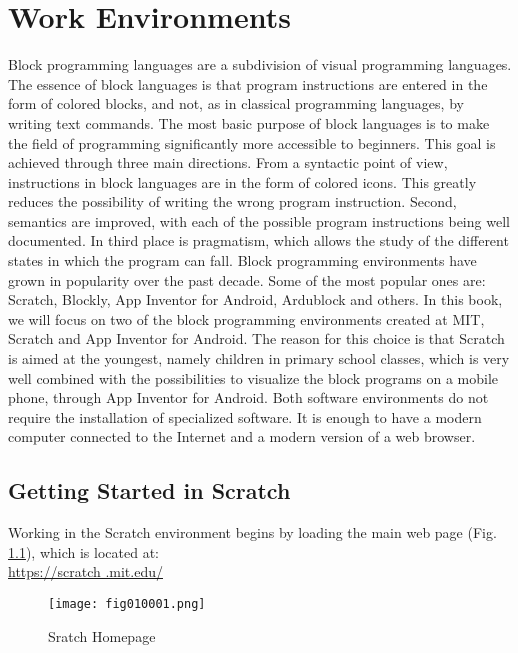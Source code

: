 \chapter{Work Environments}

Block programming languages are a subdivision of visual programming languages. The essence of block languages is that program instructions are entered in the form of colored blocks, and not, as in classical programming languages, by writing text commands. The most basic purpose of block languages is to make the field of programming significantly more accessible to beginners. This goal is achieved through three main directions. From a syntactic point of view, instructions in block languages are in the form of colored icons. This greatly reduces the possibility of writing the wrong program instruction. Second, semantics are improved, with each of the possible program instructions being well documented. In third place is pragmatism, which allows the study of the different states in which the program can fall. Block programming environments have grown in popularity over the past decade. Some of the most popular ones are: Scratch, Blockly, App Inventor for Android, Ardublock and others. In this book, we will focus on two of the block programming environments created at MIT, Scratch and App Inventor for Android. The reason for this choice is that Scratch is aimed at the youngest, namely children in primary school classes, which is very well combined with the possibilities to visualize the block programs on a mobile phone, through App Inventor for Android. Both software environments do not require the installation of specialized software. It is enough to have a modern computer connected to the Internet and a modern version of a web browser.

\section{Getting Started in Scratch}

Working in the Scratch environment begins by loading the main web page (Fig. \ref{fig010001}), which is located at: \\ \href{https://scratch.mit.edu/}{https://scratch .mit.edu/}

\begin{figure}[H]
   \centering
   \texttt{[image: fig010001.png]}
   \caption{Sratch Homepage}
\label{fig010001}
\end{figure}

